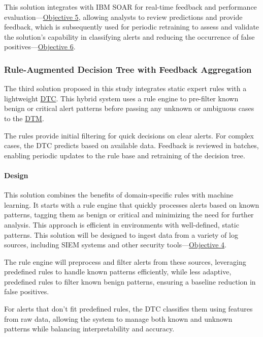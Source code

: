 This solution integrates with IBM SOAR for real-time feedback and performance evaluation—\hyperref[objective5]{Objective 5}, allowing analysts to review predictions and provide feedback, which is subsequently used for periodic retraining to assess and validate the solution's capability in classifying alerts and reducing the occurrence of false positives—\hyperref[objective6]{Objective 6}.

\subsubsection{Rule-Augmented Decision Tree with Feedback Aggregation}

The third solution proposed in this study integrates static expert rules with a lightweight \underline{\gls{DTC}}. 
This hybrid system uses a rule engine to pre-filter known benign or critical alert patterns before passing any unknown or ambiguous cases to the \underline{\gls{DTM}}. 

The rules provide initial filtering for quick decisions on clear alerts. For complex cases, the DTC predicts based on available data. 
Feedback is reviewed in batches, enabling periodic updates to the rule base and retraining of the decision tree.

\paragraph{Design}

This solution combines the benefits of domain-specific rules with machine learning.
It starts with a rule engine that quickly processes alerts based on known patterns, tagging them as benign or critical and minimizing the need for further analysis. 
This approach is efficient in environments with well-defined, static patterns. 
This solution will be designed to ingest data from a variety of log sources, including SIEM systems and other security tools—\hyperref[objective4]{Objective 4}.

The rule engine will preprocess and filter alerts from these sources, leveraging predefined rules to handle known patterns efficiently, while less adaptive, predefined rules to filter known benign patterns, ensuring a baseline reduction in false positives. 

For alerts that don't fit predefined rules, the DTC classifies them using features from raw data, allowing the system to manage both known and unknown patterns while balancing interpretability and accuracy. 

